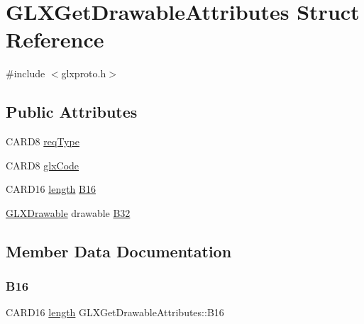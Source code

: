 \hypertarget{struct_g_l_x_get_drawable_attributes}{}\section{G\+L\+X\+Get\+Drawable\+Attributes Struct Reference}
\label{struct_g_l_x_get_drawable_attributes}


{\ttfamily \#include $<$glxproto.\+h$>$}

\subsection*{Public Attributes}
\begin{DoxyCompactItemize}
\item 
C\+A\+R\+D8 \hyperlink{struct_g_l_x_get_drawable_attributes_ade119b3c3a49bc582afce0555a215bd3}{req\+Type}
\item 
C\+A\+R\+D8 \hyperlink{struct_g_l_x_get_drawable_attributes_abe646337455905bb73f85fde2e880623}{glx\+Code}
\item 
C\+A\+R\+D16 \hyperlink{glcorearb_8h_ab9c919755bde3b34349e23a32b4e0fa7}{length} \hyperlink{struct_g_l_x_get_drawable_attributes_a9d2a12c7697103288d047dfdd14df929}{B16}
\item 
\hyperlink{glx_8h_a826f51745d9d6c81bdbac47ae2b80cf7}{G\+L\+X\+Drawable} drawable \hyperlink{struct_g_l_x_get_drawable_attributes_a48c30de41a5282906a7ef0e8cde5ba0d}{B32}
\end{DoxyCompactItemize}


\subsection{Member Data Documentation}
\mbox{\label{struct_g_l_x_get_drawable_attributes_a9d2a12c7697103288d047dfdd14df929}} 
\subsubsection{\texorpdfstring{B16}{B16}}
{\footnotesize\ttfamily C\+A\+R\+D16 \hyperlink{glcorearb_8h_ab9c919755bde3b34349e23a32b4e0fa7}{length} G\+L\+X\+Get\+Drawable\+Attributes\+::\+B16}

\mbox{\label{struct_g_l_x_get_drawable_attributes_a48c30de41a5282906a7ef0e8cde5ba0d}} 
